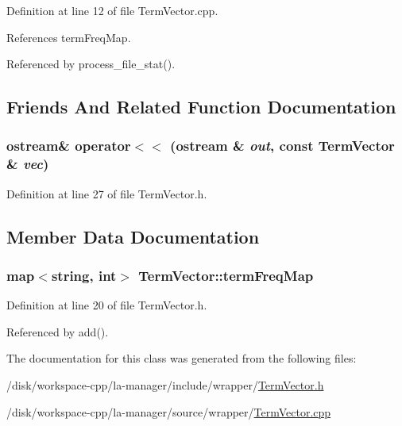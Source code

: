 Definition at line 12 of file TermVector.cpp.

References termFreqMap.

Referenced by process\_\-file\_\-stat().

\subsection{Friends And Related Function Documentation}
\hypertarget{classTermVector_e6d346b7ebb648c84dad5bd3ebfab12b}{
\subsubsection[{operator$<$$<$}]{\setlength{\rightskip}{0pt plus 5cm}ostream\& operator$<$$<$ (ostream \& {\em out}, \/  const {\bf TermVector} \& {\em vec})}}
\label{classTermVector_e6d346b7ebb648c84dad5bd3ebfab12b}




Definition at line 27 of file TermVector.h.

\subsection{Member Data Documentation}
\hypertarget{classTermVector_dadbdea84c3f32d056cd31e8fb03ec0f}{
\subsubsection[{termFreqMap}]{\setlength{\rightskip}{0pt plus 5cm}map$<$string, int$>$ {\bf TermVector::termFreqMap}}}
\label{classTermVector_dadbdea84c3f32d056cd31e8fb03ec0f}




Definition at line 20 of file TermVector.h.

Referenced by add().

The documentation for this class was generated from the following files:\begin{CompactItemize}
\item 
/disk/workspace-cpp/la-manager/include/wrapper/\hyperlink{TermVector_8h}{TermVector.h}\item 
/disk/workspace-cpp/la-manager/source/wrapper/\hyperlink{TermVector_8cpp}{TermVector.cpp}\end{CompactItemize}
